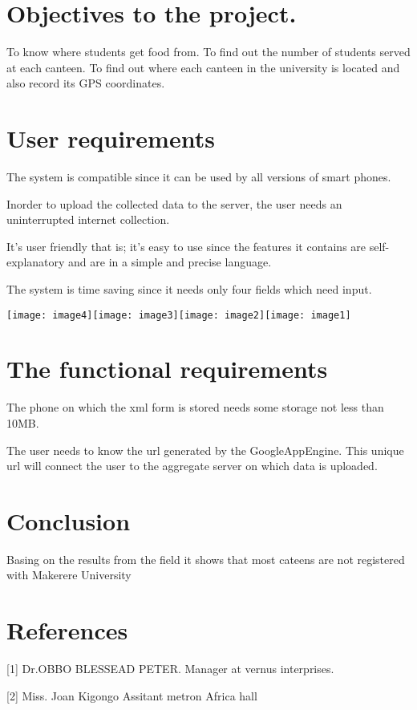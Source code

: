 \documentclass{article}
\begin{document}
\section{Objectives to the project.}
To know where students get food from.
To find out the number of students served at each canteen.
To find out where each canteen in the university is located and also record its GPS coordinates.

\section{User requirements}
The system is compatible since it can be used by all versions of smart phones.

Inorder to upload the collected data to the server, the user needs an uninterrupted internet collection.

It’s user friendly that is; it’s easy to use since the features it contains are self-explanatory and are in a simple and precise language.

The system is time saving since it needs only four fields which need input.


\texttt{[image: image4]}\texttt{[image: image3]}\texttt{[image: image2]}\texttt{[image: image1]}





 \section{The functional requirements}
The phone on which the xml form is stored needs some storage not less than 10MB.

The user needs to know the url generated by the GoogleAppEngine. This unique url will connect the user to the aggregate server on which data is uploaded.


\section{Conclusion}\label{sec:into}

Basing on the results from the field it shows that most cateens are not registered with Makerere University


\section{References}\label{sec:into}

[1] Dr.OBBO BLESSEAD PETER.
Manager at vernus interprises.


[2] Miss. Joan Kigongo
Assitant metron Africa hall
\end{document}
